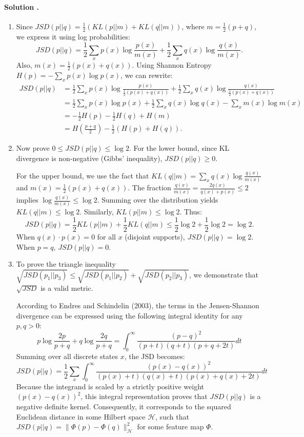 \documentclass{article}
\newcounter{solutionCount}
\newcommand{\solution}[1]{
    \stepcounter{solutionCount}
    \paragraph{Solution \thesolutionCount.}
    {
        #1
    }
}
\begin{document}
\solution{
    \begin{enumerate}
        \item Since $JSD(p||q) = \frac{1}{2} \left( KL(p||m) + KL(q||m) \right)$, where $m = \frac{1}{2}(p+q)$, we express it using log probabilities:
        \[
        JSD(p||q) = \frac{1}{2} \sum_x p(x) \log\frac{p(x)}{m(x)} + \frac{1}{2} \sum_x q(x) \log\frac{q(x)}{m(x)}.
        \]
        Also, $m(x) = \frac{1}{2}(p(x) + q(x))$. Using Shannon Entropy $H(p) = -\sum_x p(x) \log p(x)$, we can rewrite:
        \begin{align*}
            JSD(p||q) &= \frac{1}{2} \sum_x p(x) \log\frac{p(x)}{\frac{1}{2}(p(x)+q(x))} + \frac{1}{2} \sum_x q(x) \log\frac{q(x)}{\frac{1}{2}(p(x)+q(x))}\\
            &= \frac{1}{2} \sum_x p(x) \log p(x) + \frac{1}{2} \sum_x q(x) \log q(x) - \sum_x m(x) \log m(x)\\
            &= -\frac{1}{2} H(p) - \frac{1}{2} H(q) + H(m)\\
            &= H\!\left(\frac{p+q}{2}\right) - \frac{1}{2}(H(p) + H(q)).
        \end{align*}

        \item Now prove $0 \le JSD(p||q) \le \log 2$. For the lower bound, since KL divergence is non-negative (Gibbs' inequality), $JSD(p||q) \ge 0$. 
        
        For the upper bound, we use the fact that $KL(q||m) = \sum_x q(x) \log\frac{q(x)}{m(x)}$ and $m(x) = \frac{1}{2}(p(x)+q(x))$. The fraction $\frac{q(x)}{m(x)}=\frac{2q(x)}{q(x)+p(x)} \le 2$ implies $\log\frac{q(x)}{m(x)} \le \log 2$. Summing over the distribution yields $KL(q||m) \le \log 2$. Similarly, $KL(p||m) \le \log 2$. Thus:
        \[
        JSD(p||q) = \frac{1}{2} KL(p||m) + \frac{1}{2} KL(q||m) \le \frac{1}{2} \log 2 + \frac{1}{2} \log 2 = \log 2.
        \]
        When $q(x)\cdot p(x) = 0$ for all $x$ (disjoint supports), $JSD(p||q) = \log 2$. When $p = q$, $JSD(p||q) = 0$.

        \item To prove the triangle inequality $\sqrt{JSD(p_1||p_3)} \le \sqrt{JSD(p_1||p_2)} + \sqrt{JSD(p_2||p_3)}$, we demonstrate that $\sqrt{JSD}$ is a valid metric. 
        
        According to Endres and Schindelin (2003), the terms in the Jensen-Shannon divergence can be expressed using the following integral identity for any $p, q > 0$:
        \[
        p \log \frac{2p}{p+q} + q \log \frac{2q}{p+q} = \int_{0}^{\infty} \frac{(p - q)^2}{(p+t)(q+t)(p+q+2t)} dt
        \]
        Summing over all discrete states $x$, the JSD becomes:
        \[
        JSD(p||q) = \frac{1}{2} \sum_x \int_{0}^{\infty} \frac{(p(x) - q(x))^2}{(p(x)+t)(q(x)+t)(p(x)+q(x)+2t)} dt
        \]
        Because the integrand is scaled by a strictly positive weight $(p(x) - q(x))^2$, this integral representation proves that $JSD(p||q)$ is a negative definite kernel. Consequently, it corresponds to the squared Euclidean distance in some Hilbert space $\mathcal{H}$, such that $JSD(p||q) = \|\Phi(p) - \Phi(q)\|_{\mathcal{H}}^2$ for some feature map $\Phi$.
        

\end{enumerate}}
\end{document}

